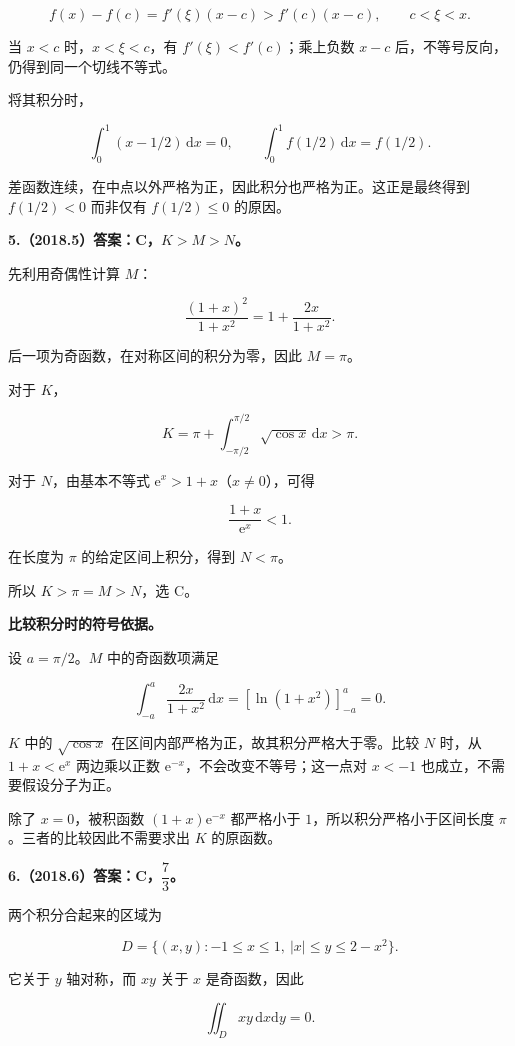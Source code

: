 \documentclass[UTF8,11pt,fontset=windows]{ctexart}
\begin{document}
$$
f(x)-f(c)=f'(\xi)(x-c)>f'(c)(x-c),\qquad c<\xi<x.
$$

当 $x<c$ 时，$x<\xi<c$，有 $f'(\xi)<f'(c)$；乘上负数 $x-c$ 后，不等号反向，仍得到同一个切线不等式。

将其积分时，

$$
\int_0^1(x-1/2)\,\mathrm dx=0,
\qquad
\int_0^1 f(1/2)\,\mathrm dx=f(1/2).
$$

差函数连续，在中点以外严格为正，因此积分也严格为正。这正是最终得到 $f(1/2)<0$ 而非仅有 $f(1/2)\le0$ 的原因。

\clearpage

\textbf{5.（2018.5）答案：C，$K>M>N$。}

先利用奇偶性计算 $M$：

$$
\frac{(1+x)^2}{1+x^2}=1+\frac{2x}{1+x^2}.
$$

后一项为奇函数，在对称区间的积分为零，因此 $M=\pi$。

对于 $K$，

$$
K=\pi+\int_{-\pi/2}^{\pi/2}\sqrt{\cos x}\,\mathrm dx>\pi.
$$

对于 $N$，由基本不等式 $\mathrm e^x>1+x$（$x\ne0$），可得

$$
\frac{1+x}{\mathrm e^x}<1.
$$

在长度为 $\pi$ 的给定区间上积分，得到 $N<\pi$。

所以 $K>\pi=M>N$，选 C。

\textbf{比较积分时的符号依据。}

设 $a=\pi/2$。$M$ 中的奇函数项满足

$$
\int_{-a}^{a}\frac{2x}{1+x^2}\,\mathrm dx
=\left[\ln(1+x^2)\right]_{-a}^{a}=0.
$$

$K$ 中的 $\sqrt{\cos x}$ 在区间内部严格为正，故其积分严格大于零。比较 $N$ 时，从 $1+x<\mathrm e^x$ 两边乘以正数 $\mathrm e^{-x}$，不会改变不等号；这一点对 $x<-1$ 也成立，不需要假设分子为正。

除了 $x=0$，被积函数 $(1+x)\mathrm e^{-x}$ 都严格小于 $1$，所以积分严格小于区间长度 $\pi$。三者的比较因此不需要求出 $K$ 的原函数。

\clearpage

\textbf{6.（2018.6）答案：C，$\dfrac73$。}

两个积分合起来的区域为

$$
D=\{(x,y):-1\le x\le1,\ |x|\le y\le2-x^2\}.
$$

它关于 $y$ 轴对称，而 $xy$ 关于 $x$ 是奇函数，因此

$$
\iint_Dxy\,\mathrm dx\mathrm dy=0.
$$
\end{document}
